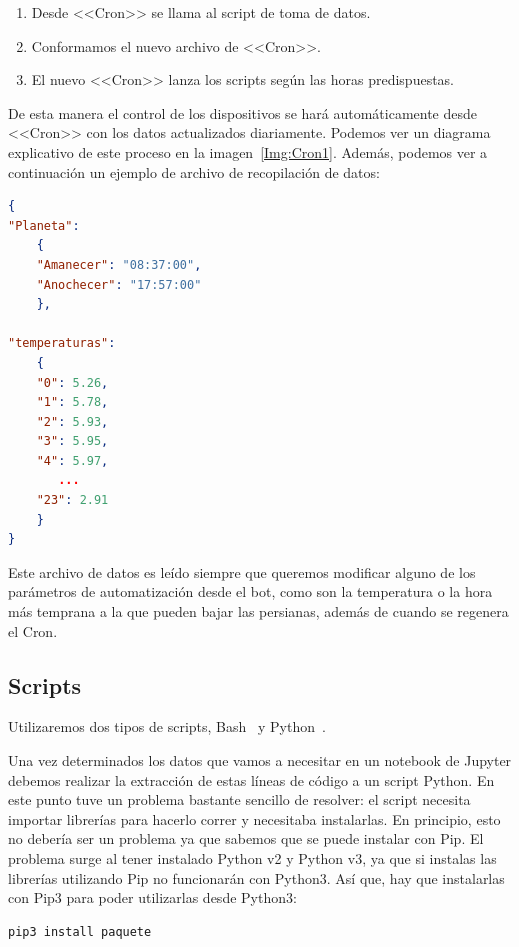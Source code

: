 \begin{enumerate}
    \item Desde <<Cron>> se llama al script de toma de datos.
    \item Conformamos el nuevo archivo de <<Cron>>.
    \item El nuevo <<Cron>> lanza los scripts según las horas predispuestas.
\end{enumerate}

De esta manera el control de los dispositivos se hará automáticamente desde <<Cron>> con los datos actualizados diariamente. Podemos ver un diagrama explicativo de este proceso en la imagen~\ref{Img:Cron1}. Además, podemos ver a continuación un ejemplo de archivo de recopilación de datos:

\begin{minipage}{\linewidth}
\begin{lstlisting}[language=json, basicstyle=\small, caption={Ejemplo archivo de recopilado de datos.}, label={lst:Ejemplo}]
{
"Planeta":
	{
	"Amanecer": "08:37:00",
	"Anochecer": "17:57:00"
	},

"temperaturas":
	{
	"0": 5.26,
	"1": 5.78,
	"2": 5.93,
	"3": 5.95,
	"4": 5.97,
	   ...
	"23": 2.91
	}
}
\end{lstlisting}
\end{minipage}



Este archivo de datos es leído siempre que queremos modificar alguno de los parámetros de automatización desde el bot, como son la temperatura o la hora más temprana a la que pueden bajar las persianas, además de cuando se regenera el Cron.

\subsection{Scripts}
Utilizaremos dos tipos de scripts, Bash~\cite{misc:Linux} y Python~\cite{misc:Python}.

Una vez determinados los datos que vamos a necesitar en un notebook de Jupyter debemos realizar la extracción de estas líneas de código a un script Python.
En este punto tuve un problema bastante sencillo de resolver: el script necesita importar librerías para hacerlo correr y necesitaba instalarlas. En principio, esto no debería ser un problema ya que sabemos que se puede instalar con Pip. El problema surge al tener instalado Python v2 y Python v3, ya que si instalas las librerías utilizando Pip no funcionarán con Python3. Así que, hay que instalarlas con Pip3 para poder utilizarlas desde Python3:
\begin{lstlisting}[language=sh,firstnumber=1]
pip3 install paquete
\end{lstlisting}

